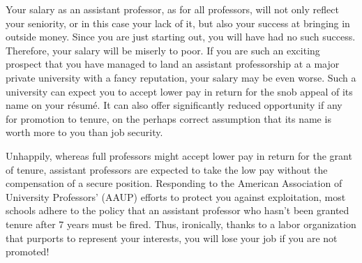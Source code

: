 \documentclass{article}
\begin{document}
\begin{enumerate}
\begin{itemize}
\begin{itemize}
			Your salary as an assistant professor, as for all professors, will not only reflect your seniority, or in this case your lack of it, but also your success at bringing in outside money. Since you are just starting out, you will have had no such success. Therefore, your salary will be miserly to poor. If you are such an exciting prospect that you have managed to land an assistant professorship at a major private university with a fancy reputation, your salary may be even worse. Such a university can expect you to accept lower pay in return for the snob appeal of its name on your r\'esum\'e. It can also offer significantly reduced opportunity if any for promotion to tenure, on the perhaps correct assumption that its name is worth more to you than job security.

			Unhappily, whereas full professors might accept lower pay in return for the grant of tenure, assistant professors are expected to take the low pay without the compensation of a secure position. Responding to the American Association of University Professors' (AAUP) efforts to protect you against exploitation, most schools adhere to the policy that an assistant professor who hasn't been granted tenure after 7 years must be fired. Thus, ironically, thanks to a labor organization that purports to represent your interests, you will lose your job if you are not promoted!


\end{itemize}
\end{itemize}
\end{enumerate}
\end{document}
